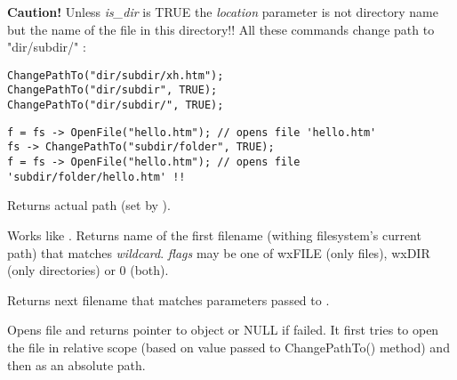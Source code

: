 {\bf Caution! } Unless {\it is\_dir} is TRUE the {\it location} parameter
is not directory name but the name of the file in this directory!! All these
commands change path to "dir/subdir/" :

\begin{verbatim}
ChangePathTo("dir/subdir/xh.htm");
ChangePathTo("dir/subdir", TRUE);
ChangePathTo("dir/subdir/", TRUE);
\end{verbatim}





\begin{verbatim}
f = fs -> OpenFile("hello.htm"); // opens file 'hello.htm'
fs -> ChangePathTo("subdir/folder", TRUE);
f = fs -> OpenFile("hello.htm"); // opens file 'subdir/folder/hello.htm' !!
\end{verbatim}

\label{wxfilesystemgetpath}


Returns actual path (set by ).


\label{wxfilesystemfindfirst}


Works like . Returns name of the first
filename (withing filesystem's current path) that matches {\it wildcard}. {\it flags} may be one of
wxFILE (only files), wxDIR (only directories) or 0 (both).

\label{wxfilesystemfindnext}


Returns next filename that matches parameters passed to .


\label{wxfilesystemopenfile}


Opens file and returns pointer to  object
or NULL if failed. It first tries to open the file in relative scope
(based on value passed to ChangePathTo() method) and then as an
absolute path.

